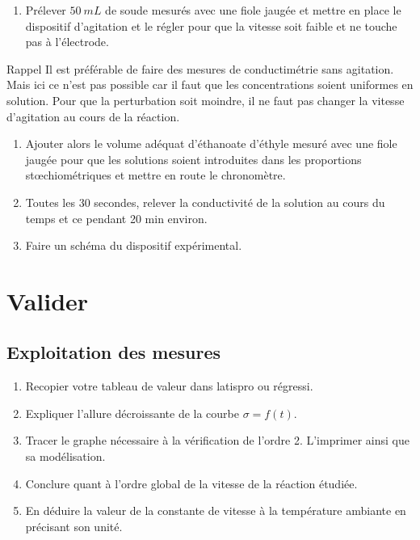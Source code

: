 \documentclass[a4paper, 11pt, final, garamond]{book}
\begin{document}
\begin{enumerate}
    \item Prélever $\SI{50}{mL}$ de soude mesurés avec une fiole jaugée et
        mettre en place le dispositif d'agitation et le  régler pour que la
        vitesse soit faible et ne touche pas à l'électrode.
\end{enumerate}
\vspace{-10pt}
\begin{brapp}{Rappel}
    \centering
    Il est préférable de faire des mesures de conductimétrie sans
    agitation. Mais ici ce n'est pas possible car il faut que les
    concentrations soient uniformes en solution. Pour que la
    perturbation soit moindre, il ne faut pas changer la vitesse
    d'agitation au cours de la réaction.
\end{brapp}
\vspace{-10pt}
\begin{enumerate}[resume]
    \item Ajouter alors le volume adéquat d'éthanoate d'éthyle mesuré avec une
        fiole jaugée pour que les solutions soient introduites dans les
        proportions stœchiométriques et mettre en route le chronomètre.
    \item Toutes les 30 secondes, relever la conductivité de la solution au
        cours du temps et ce pendant 20 min environ.
    \item Faire un schéma du dispositif expérimental.
\end{enumerate}

\section{Valider}
\subsection{Exploitation des mesures}

\begin{enumerate}[label=\sqenumi, start=17]
    \item Recopier votre tableau de valeur dans latispro ou régressi.
    \item Expliquer l'allure décroissante de la courbe $\sigma = f(t)$.
    \item Tracer le graphe nécessaire à la vérification de l'ordre 2. L'imprimer
        ainsi que sa modélisation. 
    \item Conclure quant à l'ordre global de la vitesse de la réaction étudiée.
    \item En déduire la valeur de la constante de vitesse à la température
        ambiante en précisant son unité.
\end{enumerate}
\end{document}
